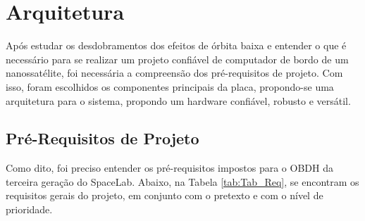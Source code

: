 \chapter{Arquitetura}

Após estudar os desdobramentos dos efeitos de órbita baixa e entender o que é necessário para se realizar um projeto confiável de computador de bordo de um nanossatélite, foi necessária a compreensão dos pré-requisitos de projeto. Com isso, foram escolhidos os componentes principais da placa, propondo-se uma arquitetura para o sistema, propondo um hardware confiável, robusto e versátil.  

\section{Pré-Requisitos de Projeto}

Como dito, foi preciso entender os pré-requisitos impostos para o OBDH da terceira geração do SpaceLab. Abaixo, na Tabela \ref{tab:Tab_Req}, se encontram os requisitos gerais do projeto, em conjunto com o pretexto e com o nível de prioridade.

